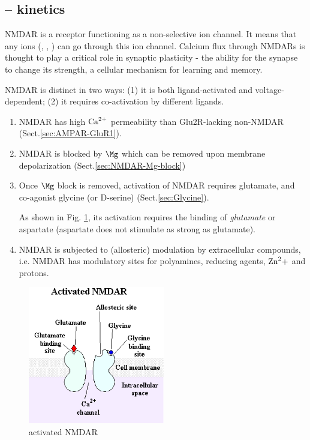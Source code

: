 \subsection{-- kinetics}
\label{sec:NMDAR-kinetics}

NMDAR is a receptor functioning as a non-selective ion channel. It means that
any ions (, , ) can go through this ion channel.
Calcium flux through NMDARs is thought to play a critical role in synaptic
plasticity - the ability for the synapse to change its strength, a cellular
mechanism for learning and memory.

NMDAR is distinct in two ways: (1) it is both ligand-activated and
voltage-dependent; (2) it requires co-activation by different ligands.

\begin{enumerate}
  \item NMDAR has high ${\text{Ca}^{2+}}$ permeability than Glu2R-lacking non-NMDAR
  (Sect.\ref{sec:AMPAR-GluR1}).

  \item NMDAR is blocked by $\Mg$ which can be removed upon membrane
  depolarization (Sect.\ref{sec:NMDAR-Mg-block}) 
  
  \item Once $\Mg$ block is removed, activation of NMDAR requires glutamate,
  and co-agonist glycine (or D-serine) (Sect.\ref{sec:Glycine}).

As shown in Fig. \ref{fig:NMDAR}, its activation requires the binding
of {\it glutamate} or aspartate (aspartate does not stimulate as
strong as glutamate).

  \item NMDAR is subjected to (allosteric) modulation by extracellular
  compounds, i.e.
  NMDAR has modulatory sites for polyamines, reducing agents, ${\text{Zn}^2+}$ and protons. 
\end{enumerate}

\begin{figure}[htb]
  \centerline{\includegraphics[height=6cm]{./images/activated_NMDAR.eps}}
  \caption{activated NMDAR }
  \label{fig:NMDAR}
\end{figure}


